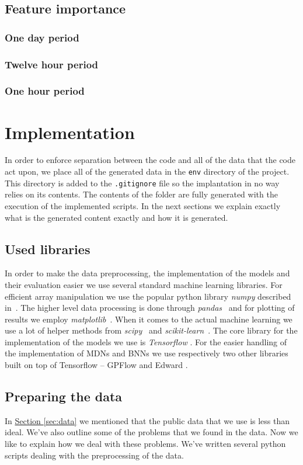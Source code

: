 \documentclass[12pt,a4paper,twoside]{scrartcl}
\numberwithin{equation}{section}
\newcommand{\refsec}[1]{\hyperref[#1]{Section \ref*{#1}}}
\begin{document}
\subsection{Feature importance}
\subsubsection{One day period}
\subsubsection{Twelve hour period}
\subsubsection{One hour period}
\section{Implementation}\label{sec:impl}
In order to enforce separation between the code and all of the data that the code act upon, we place all of the generated data in the \texttt{env} directory of the project. This directory is added to the \texttt{.gitignore} file so the implantation in no way relies on its contents. The contents of the folder are fully generated with the execution of the implemented scripts. In the next sections we explain exactly what is the generated content exactly and how it is generated.
\subsection{Used libraries}\label{sec:libs}
In order to make the data preprocessing, the implementation of the models and their evaluation easier we use several standard machine learning libraries. For efficient array manipulation we use the popular python library \emph{numpy} described in~\cite{numpy}. The higher level data processing is done through \emph{pandas}~\cite{pandas} and for plotting of results we employ \emph{matplotlib}~\cite{matplotlib}. When it comes to the actual machine learning we use a lot of helper methods from \emph{scipy}~\cite{scipy} and \emph{scikit-learn}~\cite{scikit-learn}. The core library for the implementation of the models we use is \emph{Tensorflow} \cite{tf}. For the easier handling of the implementation of MDNs and BNNs we use respectively two other libraries built on top of Tensorflow -- GPFlow \cite{gpflow} and Edward \cite{edward}. 
\subsection{Preparing the data}\label{sec:prep-data}
In \refsec{sec:data} we mentioned that the public data that we use is less than ideal. We've also outline some of the problems that we found in the data. Now we like to explain how we deal with these problems. We've written several python scripts dealing with the preprocessing of the data. 
\end{document}
